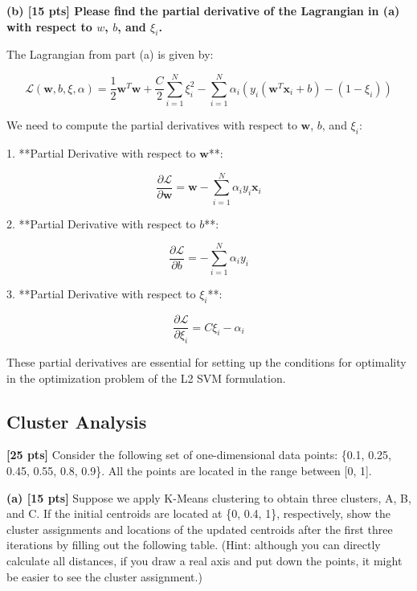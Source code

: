 \textbf{(b) [15 pts] Please find the partial derivative of the Lagrangian in (a) with respect to $w$, $b$, and $\xi_i$.
}

The Lagrangian from part (a) is given by:

\[
\mathcal{L}(\mathbf{w}, b, \xi, \alpha) = \frac{1}{2} \mathbf{w}^T \mathbf{w} + \frac{C}{2} \sum_{i=1}^{N} \xi_i^2 - \sum_{i=1}^{N} \alpha_i \left( y_i (\mathbf{w}^T \mathbf{x}_i + b) - (1 - \xi_i) \right)
\]

We need to compute the partial derivatives with respect to \( \mathbf{w} \), \( b \), and \( \xi_i \):

1. **Partial Derivative with respect to \( \mathbf{w} \)**:

\[
\frac{\partial \mathcal{L}}{\partial \mathbf{w}} = \mathbf{w} - \sum_{i=1}^{N} \alpha_i y_i \mathbf{x}_i
\]

2. **Partial Derivative with respect to \( b \)**:

\[
\frac{\partial \mathcal{L}}{\partial b} = -\sum_{i=1}^{N} \alpha_i y_i
\]

3. **Partial Derivative with respect to \( \xi_i \)**:

\[
\frac{\partial \mathcal{L}}{\partial \xi_i} = C \xi_i - \alpha_i
\]

These partial derivatives are essential for setting up the conditions for optimality in the optimization problem of the L2 SVM formulation.


\subsection{Cluster Analysis}

\textbf{[25 pts]} Consider the following set of one-dimensional data points: \{0.1, 0.25, 0.45, 0.55, 0.8, 0.9\}. All the points are located in the range between [0, 1].

\textbf{(a) [15 pts]} Suppose we apply K-Means clustering to obtain three clusters, A, B, and C. If the initial centroids are located at \{0, 0.4, 1\}, respectively, show the cluster assignments and locations of the updated centroids after the first three iterations by filling out the following table. (Hint: although you can directly calculate all distances, if you draw a real axis and put down the points, it might be easier to see the cluster assignment.)

